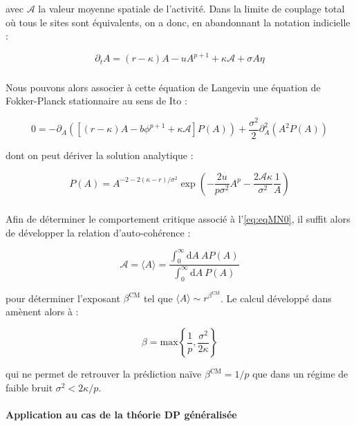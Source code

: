 \noindent avec $\mathcal{A}$ la valeur moyenne spatiale de l'activité. Dans la limite de couplage total où tous le sites sont équivalents, on a donc, en abandonnant la notation indicielle :

\begin{equation}
	\partial_t A = (r-\kappa)A - uA^{p+1} + \kappa\mathcal{A} + \sigma A \eta
	\label{eq:eqMN0}
\end{equation}

\subparagraph{}Nous pouvons alors associer à cette équation de Langevin une équation de Fokker-Planck stationnaire au sens de Ito :

\begin{equation}
    0 = -\partial_A\left( \left[(r-\kappa)A - b\phi^{p+1}+\kappa\mathcal{A} \right] P(A)\right) + \frac{\sigma^2}{2}\partial_A^2\left( A^2 P(A)\right)
\end{equation}

\noindent dont on peut dériver la solution analytique :

\begin{equation}
    P(A) = A^{-2-2(\kappa-r)/\sigma^2}\exp\left( -\frac{2u}{p\sigma^2}A^p - \frac{2\mathcal{A} \kappa}{\sigma^2}\frac{1}{A} \right)
\end{equation}

\subparagraph{}Afin de déterminer le comportement critique associé à l'\autoref{eq:eqMN0}, il suffit alors de développer la relation d'auto-cohérence :

\begin{equation}
    \mathcal{A} = \langle A \rangle = \frac{\int_0^\infty\mathrm{d}A~A P(A)}{\int_0^\infty\mathrm{d}A~P(A)}
\end{equation}

\noindent pour déterminer l'exposant $\beta^\text{CM}$ tel que $\langle A \rangle \sim r^{\beta^\text{CM}}$. Le calcul développé dans \cite{munoz_multiplicative_2003, munoz_multiplicative_2003} amènent alors à :

\begin{equation}
	\beta = \mathrm{max}\left\{ \frac{1}{p}, \frac{\sigma^2}{2\kappa}\right\}
\end{equation}

\noindent qui ne permet de retrouver la prédiction naïve $\beta^\text{CM} = 1/p$ que dans un régime de faible bruit $\sigma^2 < 2\kappa/p$.

\paragraph{Application au cas de la théorie DP généralisée}


